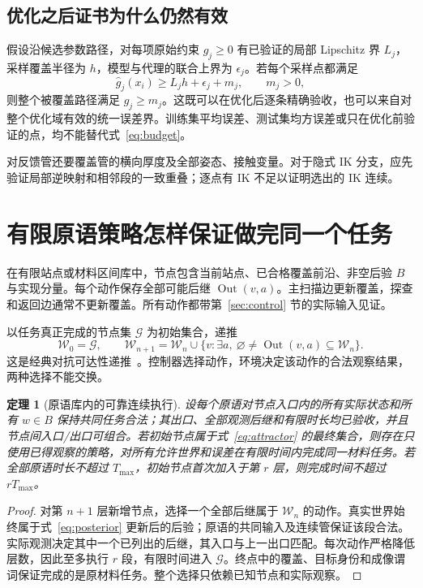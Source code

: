 \documentclass[11pt,a4paper]{article}
\theoremstyle{cn}
\newtheorem{theorem}{定理}
\newcommand{\W}{\mathcal W}
\newcommand{\Out}{\operatorname{Out}}
\begin{document}
\subsection{优化之后证书为什么仍然有效}

假设沿候选参数路径，对每项原始约束 \(g_j\ge0\) 有已验证的局部 Lipschitz 界 \(L_j\)，采样覆盖半径为 \(h\)，模型与代理的联合上界为 \(\epsilon_j\)。若每个采样点都满足
\begin{equation}
\widehat g_j(x_i)\ge L_jh+\epsilon_j+m_j,\qquad m_j>0,
\label{eq:budget}
\end{equation}
则整个被覆盖路径满足 \(g_j\ge m_j\)。这既可以在优化后逐条精确验收，也可以来自对整个优化域有效的统一误差界。训练集平均误差、测试集均方误差或只在优化前验证的点，均不能替代式~\eqref{eq:budget}。

对反馈管还要覆盖管的横向厚度及全部姿态、接触变量。对于隐式 IK 分支，应先验证局部逆映射和相邻段的一致重叠；逐点有 IK 不足以证明选出的 IK 连续。

\section{有限原语策略怎样保证做完同一个任务}
\label{sec:graph}

在有限站点或材料区间库中，节点包含当前站点、已合格覆盖前沿、非空后验 \(B\) 与实现分量。每个动作保存全部可能后继 \(\Out(v,a)\)。主扫描边更新覆盖，探查和返回边通常不更新覆盖。所有动作都带第~\ref{sec:control} 节的实际输入见证。

以任务真正完成的节点集 \(\mathcal G\) 为初始集合，递推
\begin{equation}
\W_0=\mathcal G,\qquad
\W_{n+1}=\W_n\cup
\{v:\exists a,\ \varnothing\ne\Out(v,a)\subseteq\W_n\}.
\label{eq:attractor}
\end{equation}
这是经典对抗可达性递推~\cite{output}。控制器选择动作，环境决定该动作的合法观察结果，两种选择不能交换。

\begin{theorem}[原语库内的可靠连续执行]
\label{thm:graph}
设每个原语对节点入口内的所有实际状态和所有 \(w\in B\) 保持共同任务合法；其出口、全部观测后继和有限时长均已验收，并且节点间入口/出口可组合。若初始节点属于式~\eqref{eq:attractor} 的最终集合，则存在只使用已得观察的策略，对所有允许世界和误差在有限时间内完成同一材料任务。若全部原语时长不超过 \(T_{\max}\)，初始节点首次加入于第 \(r\) 层，则完成时间不超过 \(rT_{\max}\)。
\end{theorem}

\begin{proof}
对第 \(n+1\) 层新增节点，选择一个全部后继属于 \(\W_n\) 的动作。真实世界始终属于式~\eqref{eq:posterior} 更新后的后验；原语的共同输入及连续管保证该段合法。实际观测决定其中一个已列出的后继，其入口与上一出口匹配。每次动作严格降低层数，因此至多执行 \(r\) 段，有限时间进入 \(\mathcal G\)。终点中的覆盖、目标身份和成像谓词保证完成的是原材料任务。整个选择只依赖已知节点和实际观察。
\end{proof}
\end{document}

